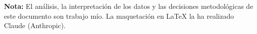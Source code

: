 \documentclass[12pt,a4paper]{article}
\begin{document}
\vspace{1em}

\vfill
\begin{tcolorbox}[colback=light, colframe=primary!40, boxrule=0.5pt, arc=3pt]
  \small\color{gray}
  \textbf{Nota:} El análisis, la interpretación de los datos y las
  decisiones metodológicas de este documento son trabajo mío.
  La maquetación en \LaTeX{} la ha realizado Claude (Anthropic).
\end{tcolorbox}
\end{document}
